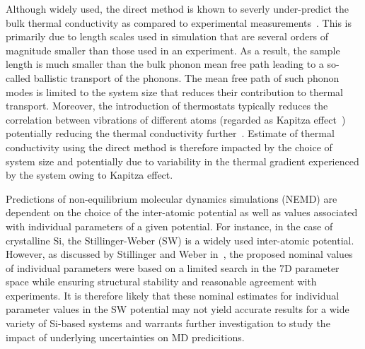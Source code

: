 Although widely used, the direct method is khown to severly under-predict
the bulk thermal conductivity as compared to experimental 
measurements~\cite{Haynes:2014,Shanks:1963}. This is primarily
due to length scales used in simulation that are several orders of magnitude smaller
than those used in an experiment. As a result, the sample length is much smaller than the
bulk phonon mean free path leading to a so-called ballistic transport of the phonons.
The mean free path of such phonon modes is limited to the system size that reduces their
contribution to thermal transport. Moreover, the
introduction of thermostats typically reduces the correlation between vibrations of 
different atoms (regarded as Kapitza effect~\cite{Stevens:2007}) potentially reducing
the thermal conductivity
further~\cite{Evans:2008}. Estimate of thermal conductivity using the
direct method is therefore impacted by the choice of system size and potentially due to
variability in the thermal gradient experienced by the system owing to
Kapitza effect.  

Predictions of non-equilibrium molecular dynamics simulations (NEMD) are dependent on the
choice of the inter-atomic potential as well as values associated with individual parameters
of a given potential. For instance, in the case of crystalline Si, the Stillinger-Weber (SW)
is a widely used inter-atomic potential. However, as discussed by Stillinger and Weber
in~\cite{Stillinger:1985}, the proposed nominal values of individual parameters were based
on a limited search in the 7D parameter space while ensuring structural stability and
reasonable agreement with experiments. It is therefore likely that these nominal estimates
for individual parameter values in the SW potential may not yield accurate results for a
wide variety of Si-based systems and warrants further investigation to study the impact of
underlying uncertainties on MD predicitions. 



